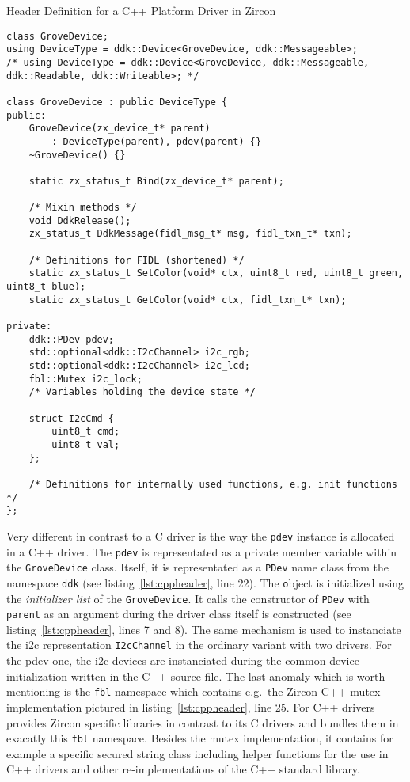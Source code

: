 \begin{listing} [H]
    \caption{Header Definition for a C++ Platform Driver in Zircon}
\label{lst:cppheader}
\begin{verbatim}
class GroveDevice;
using DeviceType = ddk::Device<GroveDevice, ddk::Messageable>;
/* using DeviceType = ddk::Device<GroveDevice, ddk::Messageable, ddk::Readable, ddk::Writeable>; */

class GroveDevice : public DeviceType {
public:
    GroveDevice(zx_device_t* parent)
        : DeviceType(parent), pdev(parent) {}
    ~GroveDevice() {}

    static zx_status_t Bind(zx_device_t* parent);

    /* Mixin methods */
    void DdkRelease();
    zx_status_t DdkMessage(fidl_msg_t* msg, fidl_txn_t* txn);

    /* Definitions for FIDL (shortened) */
    static zx_status_t SetColor(void* ctx, uint8_t red, uint8_t green, uint8_t blue);
    static zx_status_t GetColor(void* ctx, fidl_txn_t* txn);

private:
    ddk::PDev pdev;
    std::optional<ddk::I2cChannel> i2c_rgb;
    std::optional<ddk::I2cChannel> i2c_lcd;
    fbl::Mutex i2c_lock;
    /* Variables holding the device state */

    struct I2cCmd {
        uint8_t cmd;
        uint8_t val;
    };

    /* Definitions for internally used functions, e.g. init functions */
};
\end{verbatim}
\end{listing}

Very different in contrast to a C driver is the way the \texttt{pdev} instance is allocated in a C++ driver.
The \texttt{pdev} is representated as a private member variable within the \texttt{GroveDevice} class.
Itself, it is representated as a \texttt{PDev} name class from the namespace \texttt{ddk} (see listing~\ref{lst:cppheader}, line 22).
The \texttt object is initialized using the \textit{initializer list} of the \texttt{GroveDevice}.
It calls the constructor of \texttt{PDev} with \texttt{parent} as an argument during the driver class itself is constructed (see listing~\ref{lst:cppheader}, lines 7 and 8).
The same mechanism is used to instanciate the \ac{i2c} representation \texttt{I2cChannel} in the ordinary variant with two drivers.
For the pdev one, the \ac{i2c} devices are instanciated during the common device initialization written in the C++ source file.
The last anomaly which is worth mentioning is the \texttt{fbl} namespace which contains e.g.\ the Zircon C++ mutex implementation pictured in listing~\ref{lst:cppheader}, line 25.
For C++ drivers provides Zircon specific libraries in contrast to its C drivers and bundles them in exacatly this \texttt{fbl} namespace.
Besides the mutex implementation, it contains for example a specific secured string class including helper functions for the use in C++ drivers and other re-implementations of the C++ standard library.

